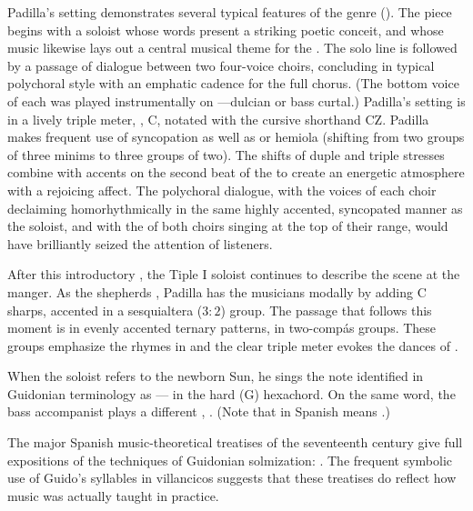 Padilla's setting demonstrates several typical features of the genre ().
The piece begins with a soloist whose words present a striking poetic conceit, and whose music likewise lays out a central musical theme for the .
The solo line is followed by a passage of dialogue between two four-voice choirs, concluding in typical polychoral style with an emphatic cadence for the full chorus.
(The bottom voice of each was played instrumentally on ---dulcian or bass curtal.)
Padilla's setting is in a lively triple meter, , C, notated with the cursive shorthand CZ. %
Padilla makes frequent use of syncopation as well as  or hemiola (shifting from two groups of three minims to three groups of two).
The shifts of duple and triple stresses combine with accents on the second beat of the  to create an energetic atmosphere with a rejoicing affect.
The polychoral dialogue, with the voices of each choir declaiming homorhythmically in the same highly accented, syncopated manner as the soloist, and with the  of both choirs singing at the top of their range, would have brilliantly seized the attention of listeners.


After this introductory , the Tiple I soloist continues to describe the scene at the manger.
As the shepherds , Padilla has the musicians  modally by adding C sharps, accented in a sesquialtera ($3:2$) group. 
The passage that follows this moment is in evenly accented ternary patterns, in two-compás groups.
These groups emphasize the rhymes in  and the clear triple meter evokes the dances of .

When the soloist refers to the newborn Sun, he sings the note identified in Guidonian terminology as --- in the hard (G) hexachord.
On the same word, the bass accompanist plays a different , .
(Note that  in Spanish means .)%
  \begin{Footnote}
  The major Spanish music-theoretical treatises of the seventeenth century give full expositions of the techniques of Guidonian solmization: \autocites{Cerone:Melopeo}{Lorente:Porque}.
  The frequent symbolic use of Guido's syllables in villancicos suggests that these treatises do reflect how music was actually taught in practice.
  \end{Footnote}

